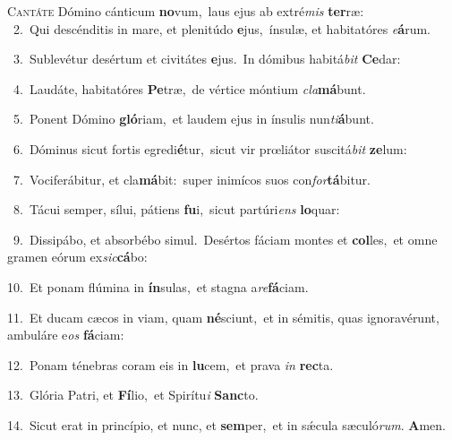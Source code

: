 \lettrine{\initial\textcolor{\initialcolor}{C}}{antáte} Dómino cánticum \textbf{no}\-vum,~\star laus ejus ab extré\textit{mis} \textbf{ter}\-ræ:\\
{\numbfont\textcolor{\numbcolor}{~2.}}~Qui descénditis in mare, et plenitúdo \textbf{e}\-jus,~\star ínsulæ, et habitatóres \textit{e}\-\textbf{á}rum.\par
{\numbfont\textcolor{\numbcolor}{~3.}}~Sublevétur desértum et civitátes \textbf{e}\-jus.~\star In dómibus habitá\textit{bit} \textbf{Ce}\-dar:\par
{\numbfont\textcolor{\numbcolor}{~4.}}~Laudáte, habitatóres \textbf{Pe}\-træ,~\star de vértice móntium \textit{cla}\-\textbf{má}bunt.\par
{\numbfont\textcolor{\numbcolor}{~5.}}~Ponent Dómino \textbf{gló}\-riam,~\star et laudem ejus in ínsulis nun\-\textit{ti}\-\textbf{á}bunt.\par
{\numbfont\textcolor{\numbcolor}{~6.}}~Dóminus sicut fortis egredi\-\textbf{é}\-tur,~\star sicut vir prœliátor suscitá\textit{bit} \textbf{ze}\-lum:\par
{\numbfont\textcolor{\numbcolor}{~7.}}~Vociferábitur, et cla\-\textbf{má}\-bit:~\star super inimícos suos con\-\textit{for}\-\textbf{tá}bitur.\par
{\numbfont\textcolor{\numbcolor}{~8.}}~Tácui semper, sílui, pátiens \textbf{fu}\-i,~\star sicut partúri\textit{ens} \textbf{lo}\-quar:\par
{\numbfont\textcolor{\numbcolor}{~9.}}~Dissipábo, et absorbébo simul.~\dagger Desértos fáciam montes et \textbf{col}\-les,~\star et omne gramen eórum ex\-\textit{sic}\-\textbf{cá}bo:\par
{\numbfont\textcolor{\numbcolor}{10.}}~Et ponam flúmina in \textbf{ín}\-sulas,~\star et stagna a\-\textit{re}\-\textbf{fá}ciam.\par
{\numbfont\textcolor{\numbcolor}{11.}}~Et ducam cæcos in viam, quam \textbf{né}\-sciunt,~\star et in sémitis, quas ignoravérunt, ambuláre e\textit{os} \textbf{fá}\-ciam:\par
{\numbfont\textcolor{\numbcolor}{12.}}~Ponam ténebras coram eis in \textbf{lu}\-cem,~\star et prava \textit{in} \textbf{rec}\-ta.\par
{\numbfont\textcolor{\numbcolor}{13.}}~Glória Patri, et \textbf{Fí}\-lio,~\star et Spirítu\textit{i} \textbf{Sanc}\-to.\par
{\numbfont\textcolor{\numbcolor}{14.}}~Sicut erat in princípio, et nunc, et \textbf{sem}\-per,~\star et in sǽcula sæculó\-\textit{rum}\-. \textbf{A}\-men.\par
